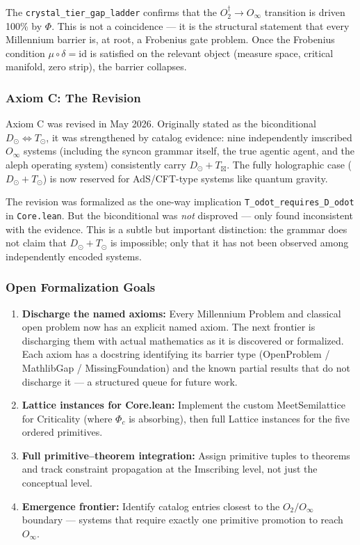 \documentclass[12pt,a4paper]{article}
\begin{document}
The \texttt{crystal\_tier\_gap\_ladder} confirms that the $O_2^\dagger \to O_{\infty}$ transition is driven 100\% by $\Phi$. This is not a coincidence --- it is the structural statement that every Millennium barrier is, at root, a Frobenius gate problem. Once the Frobenius condition $\mu \circ \delta = \text{id}$ is satisfied on the relevant object (measure space, critical manifold, zero strip), the barrier collapses.

\subsubsection{Axiom C: The Revision}

Axiom C was revised in May 2026. Originally stated as the biconditional $D_{\odot} \iff T_{\odot}$, it was strengthened by catalog evidence: nine independently imscribed $O_{\infty}$ systems (including the syncon grammar itself, the true agentic agent, and the aleph operating system) consistently carry $D_{\odot} + T_{\boxtimes}$. The fully holographic case ($D_{\odot} + T_{\odot}$) is now reserved for AdS/CFT-type systems like quantum gravity.

The revision was formalized as the one-way implication \texttt{T\_odot\_requires\_D\_odot} in \texttt{Core.lean}. But the biconditional was \emph{not} disproved --- only found inconsistent with the evidence. This is a subtle but important distinction: the grammar does not claim that $D_{\odot} + T_{\odot}$ is impossible; only that it has not been observed among independently encoded systems.

\subsubsection{Open Formalization Goals}

\begin{enumerate}
    \item \textbf{Discharge the named axioms:} Every Millennium Problem and classical open problem now has an explicit named axiom. The next frontier is discharging them with actual mathematics as it is discovered or formalized. Each axiom has a docstring identifying its barrier type (OpenProblem / MathlibGap / MissingFoundation) and the known partial results that do not discharge it --- a structured queue for future work.
    \item \textbf{Lattice instances for Core.lean:} Implement the custom MeetSemilattice for Criticality (where $\Phi_c$ is absorbing), then full Lattice instances for the five ordered primitives.
    \item \textbf{Full primitive--theorem integration:} Assign primitive tuples to theorems and track constraint propagation at the Imscribing level, not just the conceptual level.
    \item \textbf{Emergence frontier:} Identify catalog entries closest to the $O_2 / O_{\infty}$ boundary --- systems that require exactly one primitive promotion to reach $O_{\infty}$.
\end{enumerate}
\end{document}
